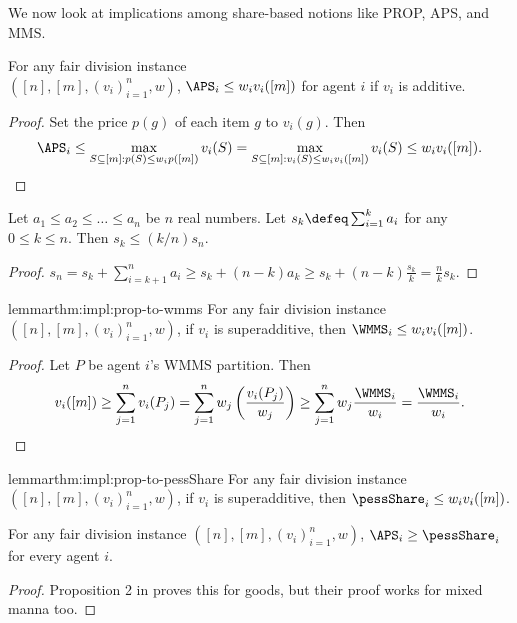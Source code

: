 We now look at implications among share-based notions like PROP, APS, and MMS.

\begin{lemma}
\label{thm:impl:prop-to-aps}
For any fair division instance
\\ $([n], [m], (v_i)_{i=1}^n, w)$,
$\APS_i \le w_iv_i([m])$ for agent $i$ if $v_i$ is additive.
\end{lemma}
\begin{proof}
Set the price $p(g)$ of each item $g$ to $v_i(g)$. Then
\[ \APS_i \le \max_{S \subseteq [m]: p(S) \le w_ip([m])} v_i(S)
= \max_{S \subseteq [m]: v_i(S) \le w_iv_i([m])} v_i(S) \le w_iv_i([m]).
\qedhere \]
\end{proof}

\begin{lemma}
\label{thm:prefix-sum-bound}
Let $a_1 \le a_2 \le \ldots \le a_n$ be $n$ real numbers.
Let $s_k \defeq \sum_{i=1}^k a_i$ for any $0 \le k \le n$.
Then $s_k \le (k/n)s_n$.
\end{lemma}
\begin{proof}
$\displaystyle s_n = s_k + \sum_{i=k+1}^n a_i \ge s_k + (n-k)a_k \ge s_k + (n-k)\frac{s_k}{k}
= \frac{n}{k}s_k$.
\end{proof}

\begin{restatable}{lemma}{rthm:impl:prop-to-wmms}
\label{thm:impl:prop-to-wmms}
For any fair division instance $([n], [m], (v_i)_{i=1}^n, w)$,
if $v_i$ is superadditive, then $\WMMS_i \le w_iv_i([m])$.
\end{restatable}
\begin{proof}
Let $P$ be agent $i$'s WMMS partition. Then
\[ v_i([m]) \ge \sum_{j=1}^n v_i(P_j) = \sum_{j=1}^n w_j\left(\frac{v_i(P_j)}{w_j}\right)
    \ge \sum_{j=1}^n w_j\frac{\WMMS_i}{w_i} = \frac{\WMMS_i}{w_i}. \qedhere \]
\end{proof}

\begin{restatable}{lemma}{rthm:impl:prop-to-pessShare}
\label{thm:impl:prop-to-pessShare}
For any fair division instance $([n], [m], (v_i)_{i=1}^n, w)$,
if $v_i$ is superadditive, then $\pessShare_i \le w_iv_i([m])$.
\end{restatable}

\begin{lemma}
\label{thm:impl:aps-to-pess}
For any fair division instance $([n], [m], (v_i)_{i=1}^n, w)$,
$\APS_i \ge \pessShare_i$ for every agent $i$.
\end{lemma}
\begin{proof}
Proposition 2 in \cite{babaioff2023fair} proves this for goods,
but their proof works for mixed manna too.
\end{proof}
